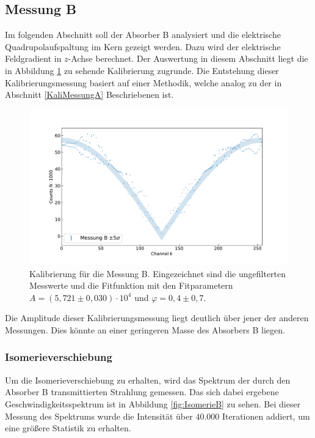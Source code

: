 \documentclass[
a4paper,                %
titlepage=firstiscover, %
captions=tableheading,  %
toc=bibliography,       %
toc=listof,             %
oneside,                %
automark,               %
12pt,                   %
english, ngerman,       %
parskip = half,         %
]{scrartcl}
\begin{document}
\subsection{Messung B}

Im folgenden Abschnitt soll der Absorber B analysiert und die elektrische Quadrupolaufspaltung im Kern gezeigt werden.
Dazu wird der elektrische Feldgradient in $z$-Achse berechnet.
Der Auswertung in diesem Abschnitt liegt die in Abbildung \ref{fig:velocityB} zu sehende Kalibrierung zugrunde.
Die Entstehung dieser Kalibrierungsmessung basiert auf einer Methodik, welche analog zu der in Abschnitt \ref{KaliMessungA} Beschriebenen ist.

\begin{figure}[H]
	\centering
	\includegraphics[width=1.0\textwidth]{dat/velocityB.pdf}
	\caption{Kalibrierung für die Messung B. Eingezeichnet sind die ungefilterten Messwerte und die Fitfunktion mit den Fitparametern $A = (5,721 \pm 0,030) \cdot 10^4$ und $\varphi=0,4 \pm 0,7$.}
	\label{fig:velocityB}
\end{figure}

\noindent Die Amplitude dieser Kalibrierungsmessung liegt deutlich über jener der anderen Messungen.
Dies könnte an einer geringeren Masse des Absorbers B liegen.


\subsubsection{Isomerieverschiebung}

Um die Isomerieverschiebung zu erhalten, wird das Spektrum der durch den Absorber B transmittierten Strahlung gemessen.
Das sich dabei ergebene Geschwindigkeitsspektrum ist in Abbildung \ref{fig:IsomerieB} zu sehen.
Bei dieser Messung des Spektrums wurde die Intensität über $40.000$ Iterationen addiert, um eine größere Statistik zu erhalten.
\end{document}
